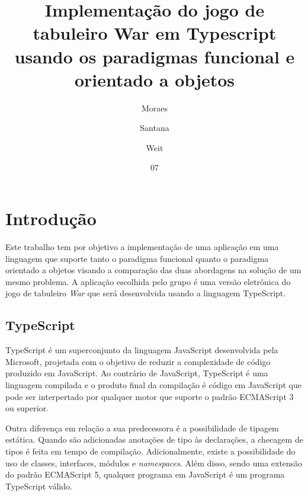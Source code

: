 \documentclass[rel_mlp]{iiufrgs}
\title{Implementação do jogo de tabuleiro War em Typescript usando os paradigmas funcional e orientado a objetos}
\author{Moraes}{Alex} %
\author{Santana}{Bruno}
\author{Weit}{João} %
\date{07}{2018}
\numberwithin{figure}{chapter}
\begin{document}
\maketitle      




\tableofcontents








%
\chapter{Introdução} \label{intro}

Este trabalho tem por objetivo a implementação de uma aplicação em uma linguagem que suporte tanto o paradigma funcional quanto o paradigma orientado a objetos visando a comparação das duas abordagens na solução de um mesmo problema. A aplicação escolhida pelo grupo é uma versão eletrônica do jogo de tabuleiro \textit{War} que será desenvolvida usando a linguagem TypeScript.

\section{TypeScript}

TypeScript é um superconjunto da linguagem JavaScript desenvolvida pela Microsoft, projetada com o objetivo de reduzir a complexidade de código produzido em JavaScript. Ao contrário de JavaScript, TypeScript é uma linguagem compilada e o produto final da compilação é código em JavaScript que pode ser interpertado por qualquer motor que suporte o padrão ECMAScript 3 ou superior.

Outra diferença em relação a sua predecessora é a possibilidade de tipagem estática. Quando são adicionadas anotações de tipo às declarações, a checagem de tipos é feita em tempo de compilação. Adicionalmente, existe a possibilidade do uso de classes, interfaces, módulos e \textit{namespaces}. Além disso, sendo uma extensão do padrão ECMAScript 5, qualquer programa em JavaScript é um programa TypeScript válido.
\end{document}
